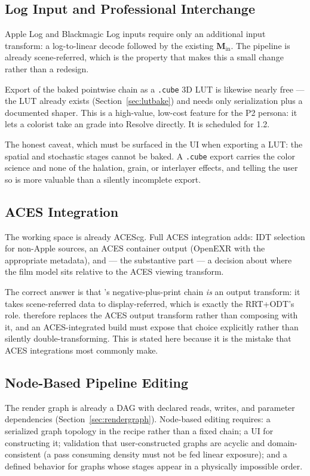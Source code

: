 \subsection{Log Input and Professional Interchange}

Apple Log and Blackmagic Log inputs require only an additional input transform:
a log-to-linear decode followed by the existing $\mathbf{M}_{\mathrm{in}}$. The
pipeline is already scene-referred, which is the property that makes this a
small change rather than a redesign.

Export of the baked pointwise chain as a \texttt{.cube} 3D LUT is likewise
nearly free --- the LUT already exists (Section~\ref{sec:lutbake}) and needs
only serialization plus a documented shaper. This is a high-value, low-cost
feature for the P2 persona: it lets a colorist take an \EM{} grade into
Resolve directly. It is scheduled for 1.2.

The honest caveat, which must be surfaced in the UI when exporting a LUT: the
spatial and stochastic stages cannot be baked. A \texttt{.cube} export carries
the color science and none of the halation, grain, or interlayer effects, and
telling the user so is more valuable than a silently incomplete export.

\subsection{ACES Integration}

The working space is already ACEScg. Full ACES integration adds: IDT selection
for non-Apple sources, an ACES container output (OpenEXR with the appropriate
metadata), and --- the substantive part --- a decision about where the film
model sits relative to the ACES viewing transform.

The correct answer is that \EM{}'s negative-plus-print chain \emph{is} an
output transform: it takes scene-referred data to display-referred, which is
exactly the RRT+ODT's role. \EM{} therefore replaces the ACES output transform
rather than composing with it, and an ACES-integrated build must expose that
choice explicitly rather than silently double-transforming. This is stated here
because it is the mistake that ACES integrations most commonly make.

\subsection{Node-Based Pipeline Editing}

The render graph is already a DAG with declared reads, writes, and parameter
dependencies (Section~\ref{sec:rendergraph}). Node-based editing requires: a
serialized graph topology in the recipe rather than a fixed chain; a UI for
constructing it; validation that user-constructed graphs are acyclic and
domain-consistent (a pass consuming density must not be fed linear exposure);
and a defined behavior for graphs whose stages appear in a physically impossible
order.

